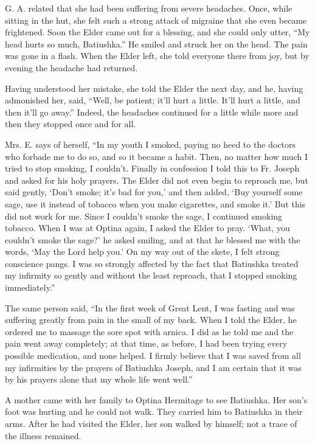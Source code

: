 G. A. related that she had been suffering from severe headaches. Once, while sitting in the hut, she felt such a strong attack of migraine that she even became frightened. Soon the Elder came out for a blessing, and she could only utter, ``My head hurts so much, Batiushka.'' He smiled and struck her on the head. The pain was gone in a flash. When the Elder left, she told everyone there from joy, but by evening the headache had returned.

Having understood her mistake, she told the Elder the next day, and he, having admonished her, said, ``Well, be patient; it'll hurt a little. It'll hurt a little, and then it'll go away.'' Indeed, the headaches continued for a little while more and then they stopped once and for all.

Mrs. E. says of herself, ``In my youth I smoked, paying no heed to the doctors who forbade me to do so, and so it became a habit. Then, no matter how much I tried to stop smoking, I couldn't. Finally in confession I told this to Fr. Joseph and asked for his holy prayers. The Elder did not even begin to reproach me, but said gently, `Don't smoke; it's bad for you,' and then added, `Buy yourself some sage, use it instead of tobacco when you make cigarettes, and smoke it.' But this did not work for me. Since I couldn't smoke the sage, I continued smoking tobacco. When I was at Optina again, I asked the Elder to pray. `What, you couldn't smoke the sage?' he asked smiling, and at that he blessed me with the words, `May the Lord help you.' On my way out of the skete, I felt strong conscience pangs. I was so strongly affected by the fact that Batiushka treated my infirmity so gently and without the least reproach, that I stopped smoking immediately.''

The same person said, ``In the first week of Great Lent, I was fasting and was suffering greatly from pain in the small of my back. When I told the Elder, he ordered me to massage the sore spot with arnica. I did as he told me and the pain went away completely; at that time, as before, I had been trying every possible medication, and none helped. I firmly believe that I was saved from all my infirmities by the prayers of Batiushka Joseph, and I am certain that it was by his prayers alone that my whole life went well.''

A mother came with her family to Optina Hermitage to see Batiushka. Her son's foot was hurting and he could not walk. They carried him to Batiushka in their arms. After he had visited the Elder, her son walked by himself; not a trace of the illness remained.

